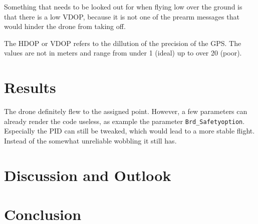 \documentclass[svgnames]{article}
\begin{document}
	Something that needs to be looked out for when flying low over the ground is that there is a low \gls{VDOP}, because it is not one of the prearm messages that would hinder the drone from taking off. 
	
	\begin{Explanation}
		\item The \gls{HDOP} or \gls{VDOP} refers to the dillution of the precision of the \gls{GPS}. The values are not in meters and range from under 1 (ideal) up to over 20 (poor). 
	\end{Explanation}
	
	\section{Results}
	The drone definitely flew to the assigned point. However, a few parameters can already render the code useless, as example the parameter \lstinline|Brd_Safetyoption|. Especially the \gls{PID} can still be tweaked, which would lead to a more stable flight. Instead of the somewhat unreliable wobbling it still has.


	
	
	\section{Discussion and Outlook}


	
	\section{Conclusion}
	\newpage
	\renewcommand{\thesubsection}{\Alph{subsection}}
	\pagebreak
	\appendix
\end{document}
